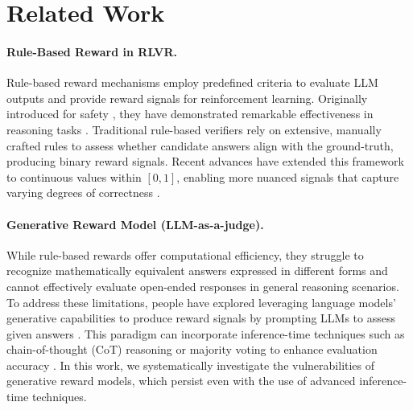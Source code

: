 \section{Related Work}
\label{app:related}

\paragraph{Rule-Based Reward in RLVR.} Rule-based reward mechanisms employ predefined criteria to evaluate LLM outputs and provide reward signals for reinforcement learning.  Originally introduced for safety \citep{mu2024rule}, they have demonstrated remarkable effectiveness in reasoning tasks \citep{lambert2024t, gandhi2024stream, zhang2024openrft, zheng2025learning, zheng2025parallel,dai2025cde, zhu2025surprising, wei2025webagent,zhou2025evolving, guo2025deepseek, team2025kimi}. Traditional rule-based verifiers rely on extensive, manually crafted rules to assess whether candidate answers align with the ground-truth, producing binary reward signals. Recent advances have extended this framework to continuous values within $[0,1]$, enabling more nuanced signals that capture varying degrees of correctness \citep{luong2024reft, li2024humans, ma2025sorft, xie2025logic}.


\paragraph{Generative Reward Model (LLM-as-a-judge).} While rule-based rewards offer computational efficiency, they struggle to recognize mathematically equivalent answers expressed in different forms and cannot effectively evaluate open-ended responses in general reasoning scenarios. To address these limitations, people have explored leveraging language models' generative capabilities to produce reward signals by prompting LLMs to assess given answers \citep{zheng2023judging, lee2023rlaif, tian2024toward,zhang2024generative,zhou2024labsafety, zhou2024defending, wei2024instructrag,huang2025rzeroselfevolvingreasoningllm, li2025self,su2025crossing,general-reasoner}. This paradigm can incorporate inference-time techniques such as chain-of-thought (CoT) reasoning or majority voting to enhance evaluation accuracy \citep{zhang2024generative}. In this work, we systematically investigate the vulnerabilities of generative reward models,  which persist even with the use of advanced inference-time techniques.


